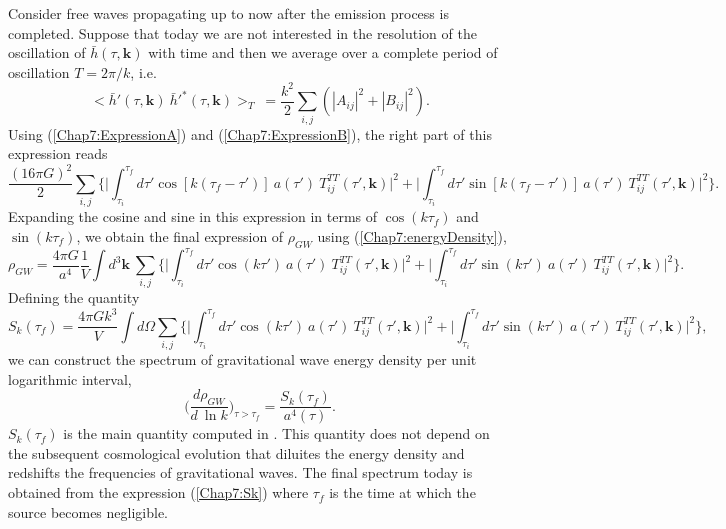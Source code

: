 \documentclass[11pt,a4paper,twoside]{book}
\begin{document}
Consider free waves propagating up to now after the emission process is completed. Suppose that today we are not interested in the resolution of the oscillation of $ \bar{h}(\tau,\textbf{k}) $ with time and then we average over a complete period of oscillation $ T=2\pi/k $, i.e.
\begin{equation}
\label{Chap7:spectrumh}
<\bar{h}'(\tau,\textbf{k})\  \bar{h}'^{*}(\tau,\textbf{k})>_{T}\  = \frac{k^{2}}{2}\sum_{i,j}(|A_{ij}|^{2} + |B_{ij}|^{2}).
\end{equation}
Using (\ref{Chap7:ExpressionA}) and (\ref{Chap7:ExpressionB}), the right part of this expression reads
\begin{equation}
 \frac{(16\pi G)^{2}}{2}\sum_{i,j}\Biggl\{\Bigg|\int_{\tau_{i}}^{\tau_{f}} d\tau'\cos[k(\tau_{f}-\tau')]\ a(\tau')\ T_{ij}^{TT}(\tau', \textbf{k})\Bigg|^{2} + \Bigg|\int_{\tau_{i}}^{\tau_{f}} d\tau'\sin[k(\tau_{f}-\tau')]\ a(\tau')\ T_{ij}^{TT}(\tau', \textbf{k})      \Bigg|^{2}\Biggr\}.
\end{equation}
Expanding the cosine and sine in this expression in terms of $\cos(k\tau_{f})$ and $ \sin(k\tau_{f}) $, we obtain the final expression of $\rho_{GW}$ using (\ref{Chap7:energyDensity}),
\begin{equation}
	\label{Chap7:energyDensityCompleteExpression}
	\rho_{GW}=\frac{4\pi G}{a^{4}}\frac{1}{V}\int d^{3}\textbf{k} \ \sum_{i,j}\Biggl\{\Bigg|\int_{\tau_{i}}^{\tau_{f}} d\tau'\cos(k\tau')\ a(\tau')\ T_{ij}^{TT}(\tau', \textbf{k})\Bigg|^{2} + \Bigg|\int_{\tau_{i}}^{\tau_{f}} d\tau'\sin(k\tau')\ a(\tau')\ T_{ij}^{TT}(\tau', \textbf{k})    \Bigg|^{2}\Biggr\}.
\end{equation}
Defining the quantity
\begin{equation}
\label{Chap7:Sk}
S_{k}(\tau_{f})=\frac{4\pi G k^{3}}{V}\int d\Omega \sum_{i,j}\Biggl\{\Bigg|\int_{\tau_{i}}^{\tau_{f}} d\tau'\cos(k\tau')\ a(\tau')\ T_{ij}^{TT}(\tau', \textbf{k})\Bigg|^{2} + \Bigg|\int_{\tau_{i}}^{\tau_{f}} d\tau'\sin(k\tau')\ a(\tau')\ T_{ij}^{TT}(\tau', \textbf{k})    \Bigg|^{2}\Biggr\},
\end{equation}
we can construct the spectrum of gravitational wave energy density per unit logarithmic interval,
\begin{equation}
\label{Chap7:EnergyDensityPerUnitLog}
\Bigg(\frac{d \rho_{GW}}{d\ \ln k}\Bigg)_{\tau > \tau_{f}} = \frac{S_k (\tau_{f})}{a^{4}(\tau)}.
\end{equation}
$ S_{k}(\tau_{f}) $ is the main quantity computed in \cite{Chap7:GreenMethod}. This quantity does not depend on the subsequent cosmological evolution that diluites the energy density and redshifts the frequencies of gravitational waves. The final spectrum today is obtained from the expression (\ref{Chap7:Sk}) where $\tau_{f}$ is the time at which the source becomes negligible.
\end{document}
